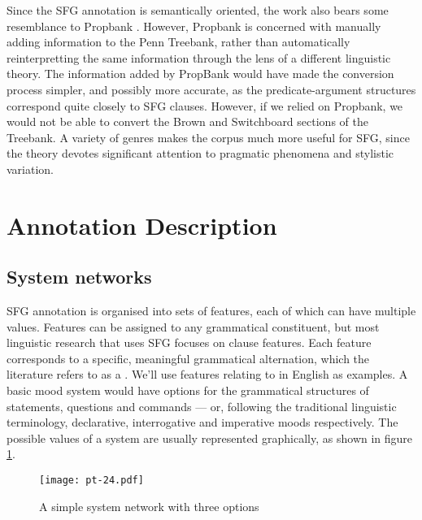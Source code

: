 \documentclass[11pt]{article}
\begin{document}
Since the SFG annotation is semantically oriented, the work also bears some resemblance to Propbank \citep{propbank}. However, Propbank is concerned with manually adding information to the Penn Treebank, rather than automatically reinterpretting the same information through the lens of a different linguistic theory. The information added by PropBank would have made the conversion process simpler, and possibly more accurate, as the predicate-argument structures correspond quite closely to SFG clauses. However, if we relied on Propbank, we would not be able to convert the Brown and Switchboard sections of the Treebank. A variety of genres makes the corpus much more useful for SFG, since the theory devotes significant attention to pragmatic phenomena and stylistic variation.

\section{Annotation Description}

\subsection{System networks}

SFG annotation is organised into sets of features, each of which can have multiple values. Features can be assigned to any grammatical constituent, but most linguistic research that uses SFG focuses on clause features.
Each feature corresponds to a specific, meaningful grammatical alternation, which the literature refers to as a . We'll use features relating to  in English as examples. A basic mood system would have options for the grammatical structures of statements, questions and commands --- or, following the traditional linguistic terminology, declarative, interrogative and imperative moods respectively. The possible values of a system are usually represented graphically, as shown in figure \ref{mood-simple}. 


\begin{figure}[h!]
  \centering
  \texttt{[image: pt-24.pdf]}
  \caption{A simple system network with three options}\label{mood-simple}
\end{figure}
\end{document}
